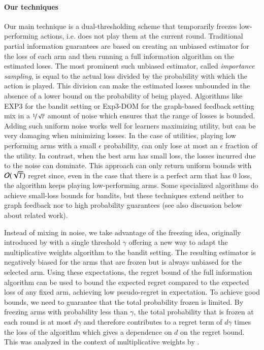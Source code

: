 \paragraph{Our techniques}
Our main technique is a dual-thresholding scheme that temporarily freezes low-performing actions, i.e. does not play them at the current round. Traditional partial information guarantees are based on creating an unbiased estimator for the loss of each arm and then running a full information algorithm on the estimated loses. The most prominent such unbiased estimator, called \emph{importance sampling}, is equal to the actual loss divided by the probability with which the action is played. This division can make the estimated losses unbounded in the absence of a lower bound on the probability of being played. Algorithms like EXP3 \citep{Auer2003} for the bandit setting or Exp3-DOM \citep{AlonCGMMS} for the graph-based feedback setting mix in a $\nicefrac{1}{\sqrt{T}}$ amount of noise which ensures
that the range of losses is bounded.  Adding such uniform noise works well for learners maximizing utility, but can be very damaging when minimizing losses. In the case of utilities, playing low performing arms with a small $\epsilon$ probability, can only lose at most an $\epsilon$ fraction of the utility. In contrast, when the best arm has small loss, the losses incurred due to the noise can dominate. This approach can only return uniform bounds with $\mathcal{O}{(\sqrt{T})}$ 
regret since, even in the case that there is a perfect arm that has $0$ loss, the algorithm keeps playing low-performing arms. Some specialized algorithms do achieve small-loss bounds for bandits, but these techniques extend neither to graph feedback nor to high probability guarantees (see also discussion below about related work).

Instead of mixing in noise, we take advantage of the freezing idea, originally introduced by \cite{Allenberg2006} with a single threshold $\gamma$ offering a new way to adapt the multiplicative weights algorithm to the bandit setting.
The resulting estimator is negatively 
biased for the arms that are frozen but is always unbiased for the selected arm. 
Using these expectations, the regret bound of the full information algorithm can be used to bound the expected regret compared to the expected loss of any fixed arm, achieving low pseudo-regret in expectation.
To achieve good bounds, we need to guarantee that the total probability frozen is limited. By freezing arms with probability less than $\gamma$, the 
total probability that is frozen at each round is at most $d\gamma$ and therefore contributes to a regret term of $d\gamma$ times the loss of the algorithm which gives a dependence on $d$ on the regret bound. This was analyzed in the context of multiplicative weights by \cite{Allenberg2006}.


